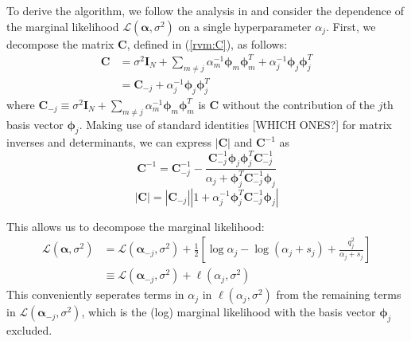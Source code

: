 To derive the algorithm, we follow the analysis in \cite{tipping2002} and consider the dependence of the marginal likelihood $\mathcal{L}(\bm\alpha,\sigma^2)$ on a single hyperparameter $\alpha_j$.
First, we decompose the matrix $\bm C$, defined in (\ref{rvm:C}), as follows:
\begin{equation*}
  \begin{split}
    \bm C &= \sigma^2 \bm I_N + \sum_{m \neq j} \alpha_m^{-1}\bm\phi_m\bm\phi_m^T + \alpha_j^{-1}\bm\phi_j\bm\phi_j^T \\
    &= \bm C_{-j} + \alpha_j^{-1}\bm\phi_j\bm\phi_j^T
  \end{split}
\end{equation*}
where $\bm C_{-j} \equiv \sigma^2 \bm I_N + \sum_{m \neq j} \alpha_m^{-1}\bm\phi_m\bm\phi_m^T$ is $\bm C$ without the contribution of the $j$th basis vector $\bm\phi_j$.
Making use of standard identities [WHICH ONES?] for matrix inverses and determinants, we can express $|\bm C|$ and $\bm C^{-1}$ as
\begin{equation*}
  \bm C^{-1} = \bm C_{-j}^{-1} - \frac{\bm C_{-j}^{-1}\bm\phi_j\bm\phi_j^T\bm C_{-j}^{-1}}{\alpha_j + \bm\phi_j^T\bm C_{-j}^{-1}\bm\phi_j}
\end{equation*}
\begin{equation*}
  \left|\bm C\right| = \left|\bm C_{-j}\right|\left|1 + \alpha^{-1}_j\bm\phi_j^T\bm C_{-j}^{-1}\bm\phi_j\right|
\end{equation*}

This allows us to decompose the marginal likelihood:
\begin{equation}
  \label{rvm:fastML}
  \begin{split}
    \mathcal{L}(\bm\alpha,\sigma^2) &= \mathcal{L}(\bm\alpha_{-j},\sigma^2) + \frac{1}{2}\left[\log\alpha_j
      - \log(\alpha_j + s_j) + \frac{q_j^2}{\alpha_j + s_j}\right]\\
    &\equiv \mathcal{L}(\bm\alpha_{-j},\sigma^2) + \ell(\alpha_j,\sigma^2)
  \end{split}
\end{equation}
This conveniently seperates terms in $\alpha_j$ in $\ell(\alpha_j,\sigma^2)$ from the remaining terms in $\mathcal{L}(\bm\alpha_{-j},\sigma^2)$, which is the (log) marginal likelihood with the basis vector $\bm\phi_j$ excluded.

